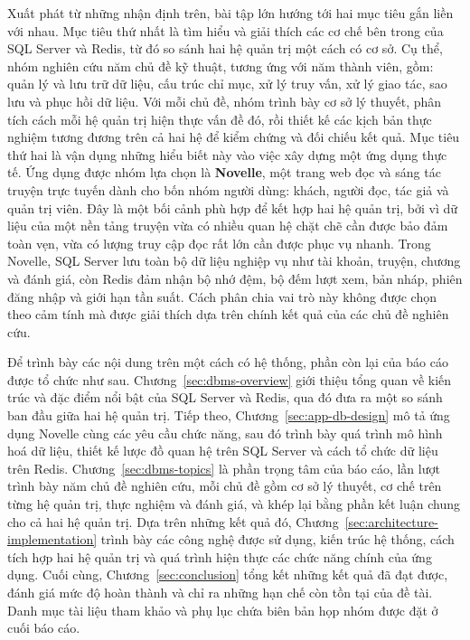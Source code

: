 Xuất phát từ những nhận định trên, bài tập lớn hướng tới hai mục tiêu gắn liền với nhau. Mục tiêu thứ nhất là tìm hiểu và giải thích các cơ chế bên trong của SQL Server và Redis, từ đó so sánh hai hệ quản trị một cách có cơ sở. Cụ thể, nhóm nghiên cứu năm chủ đề kỹ thuật, tương ứng với năm thành viên, gồm: quản lý và lưu trữ dữ liệu, cấu trúc chỉ mục, xử lý truy vấn, xử lý giao tác, sao lưu và phục hồi dữ liệu. Với mỗi chủ đề, nhóm trình bày cơ sở lý thuyết, phân tích cách mỗi hệ quản trị hiện thực vấn đề đó, rồi thiết kế các kịch bản thực nghiệm tương đương trên cả hai hệ để kiểm chứng và đối chiếu kết quả. Mục tiêu thứ hai là vận dụng những hiểu biết này vào việc xây dựng một ứng dụng thực tế. Ứng dụng được nhóm lựa chọn là \textbf{Novelle}, một trang web đọc và sáng tác truyện trực tuyến dành cho bốn nhóm người dùng: khách, người đọc, tác giả và quản trị viên. Đây là một bối cảnh phù hợp để kết hợp hai hệ quản trị, bởi vì dữ liệu của một nền tảng truyện vừa có nhiều quan hệ chặt chẽ cần được bảo đảm toàn vẹn, vừa có lượng truy cập đọc rất lớn cần được phục vụ nhanh. Trong Novelle, SQL Server lưu toàn bộ dữ liệu nghiệp vụ như tài khoản, truyện, chương và đánh giá, còn Redis đảm nhận bộ nhớ đệm, bộ đếm lượt xem, bản nháp, phiên đăng nhập và giới hạn tần suất. Cách phân chia vai trò này không được chọn theo cảm tính mà được giải thích dựa trên chính kết quả của các chủ đề nghiên cứu.

Để trình bày các nội dung trên một cách có hệ thống, phần còn lại của báo cáo được tổ chức như sau. Chương~\ref{sec:dbms-overview} giới thiệu tổng quan về kiến trúc và đặc điểm nổi bật của SQL Server và Redis, qua đó đưa ra một so sánh ban đầu giữa hai hệ quản trị. Tiếp theo, Chương~\ref{sec:app-db-design} mô tả ứng dụng Novelle cùng các yêu cầu chức năng, sau đó trình bày quá trình mô hình hoá dữ liệu, thiết kế lược đồ quan hệ trên SQL Server và cách tổ chức dữ liệu trên Redis. Chương~\ref{sec:dbms-topics} là phần trọng tâm của báo cáo, lần lượt trình bày năm chủ đề nghiên cứu, mỗi chủ đề gồm cơ sở lý thuyết, cơ chế trên từng hệ quản trị, thực nghiệm và đánh giá, và khép lại bằng phần kết luận chung cho cả hai hệ quản trị. Dựa trên những kết quả đó, Chương~\ref{sec:architecture-implementation} trình bày các công nghệ được sử dụng, kiến trúc hệ thống, cách tích hợp hai hệ quản trị và quá trình hiện thực các chức năng chính của ứng dụng. Cuối cùng, Chương~\ref{sec:conclusion} tổng kết những kết quả đã đạt được, đánh giá mức độ hoàn thành và chỉ ra những hạn chế còn tồn tại của đề tài. Danh mục tài liệu tham khảo và phụ lục chứa biên bản họp nhóm được đặt ở cuối báo cáo.
